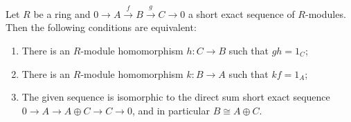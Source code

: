 Let $R$ be a ring and $0 \to A \xrightarrow{f} B \xrightarrow{g} C \to 0$ a short exact sequence of $R$-modules. Then the following conditions are equivalent:
\begin{enumerate}
\item[(i)] There is an $R$-module homomorphism $h : C \to B$ such that $gh = 1_C$;
\item[(ii)] There is an $R$-module homomorphism $k : B \to A$ such that $kf = 1_A$;
\item[(iii)] The given sequence is isomorphic to the direct sum short exact sequence $0 \to A \to A \oplus C \to C \to 0$, and in particular $B \cong A \oplus C$.
\end{enumerate}
